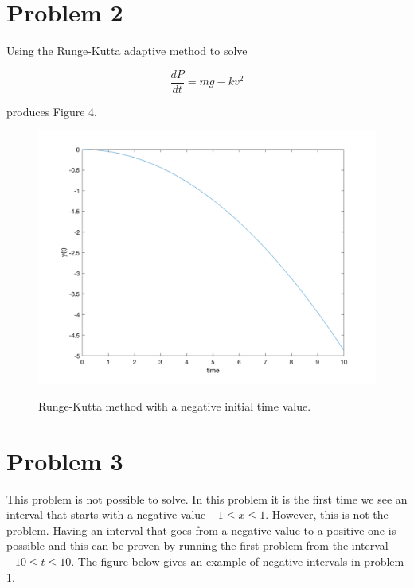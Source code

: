 \documentclass[12pt]{article}
\begin{document}
\newpage

\section*{Problem 2}

Using the Runge-Kutta adaptive method to solve 

$$
\frac{dP}{dt} = mg - kv^{2}
$$

produces Figure 4.

\begin{figure}[h!]
    \centering
    {{\includegraphics[width=15cm]{problem_2.png}}}%
    \qquad
    \caption{Runge-Kutta method with a negative initial time value.}%
    \label{fig:example}%
\end{figure}

\newpage

\section*{Problem 3}

This problem is not possible to solve. In this problem it is the first time we see an interval that starts with a negative value $-1 \leq x \leq 1$. However, this is not the problem. Having an interval that goes from a negative value to a positive one is possible and this can be proven by running the first problem from the interval $-10 \leq t \leq 10$. The figure below gives an example of negative intervals in problem 1.
\end{document}
